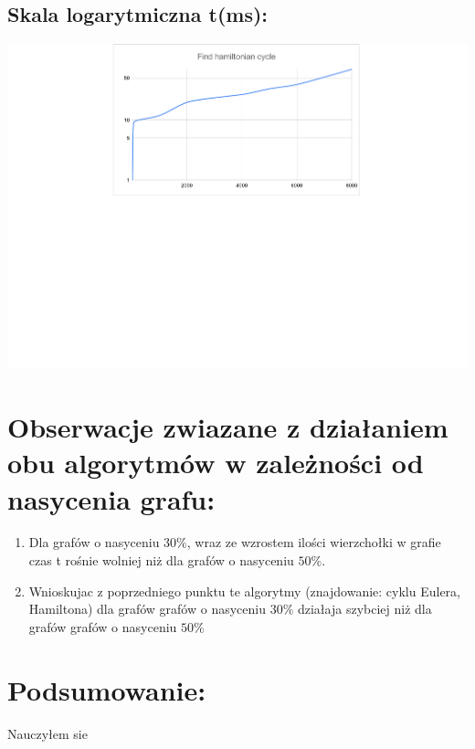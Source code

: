 \documentclass[12pt]{article}
\begin{document}
\subsection{Skala logarytmiczna t(ms): }

\begin{center}

\includegraphics[scale=0.5]{wykres_logarytmiczy_1.pdf}

\end{center}

\section{Obserwacje zwiazane z działaniem obu algorytmów w zależności od nasycenia grafu: }

\begin{enumerate}

	\item 
			Dla grafów o nasyceniu $30\%$, wraz ze wzrostem ilości wierzchołki w grafie czas t rośnie wolniej niż dla grafów o nasyceniu $50\%$.
	\item
			Wnioskujac z poprzedniego punktu te algorytmy (znajdowanie: cyklu Eulera, Hamiltona) dla grafów grafów o nasyceniu $30\%$ działaja szybciej niż dla grafów grafów o nasyceniu $50\%$

\end{enumerate}


\section{Podsumowanie: }

Nauczyłem sie
\end{document}
